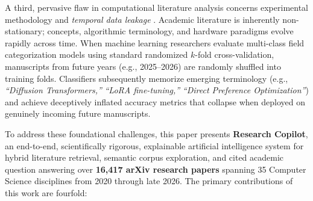 \documentclass[journal]{IEEEtran}
\begin{document}
A third, pervasive flaw in computational literature analysis concerns experimental methodology and \textit{temporal data leakage} \cite{kapoor2023leakage}. Academic literature is inherently non-stationary; concepts, algorithmic terminology, and hardware paradigms evolve rapidly across time. When machine learning researchers evaluate multi-class field categorization models using standard randomized $k$-fold cross-validation, manuscripts from future years (e.g., 2025--2026) are randomly shuffled into training folds. Classifiers subsequently memorize emerging terminology (e.g., \textit{``Diffusion Transformers,''} \textit{``LoRA fine-tuning,''} \textit{``Direct Preference Optimization''}) and achieve deceptively inflated accuracy metrics that collapse when deployed on genuinely incoming future manuscripts.

To address these foundational challenges, this paper presents \textbf{Research Copilot}, an end-to-end, scientifically rigorous, explainable artificial intelligence system for hybrid literature retrieval, semantic corpus exploration, and cited academic question answering over \textbf{16,417 arXiv research papers} spanning 35 Computer Science disciplines from 2020 through late 2026. The primary contributions of this work are fourfold:
\end{document}
